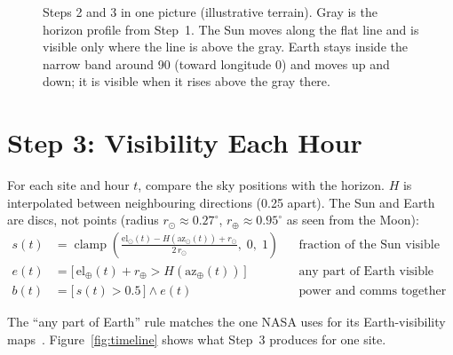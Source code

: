 \documentclass[11pt,a4paper]{article}
\newcommand{\sun}{\odot}
\newcommand{\earth}{\oplus}
\begin{document}
\begin{figure}[ht]
\caption{Steps 2 and 3 in one picture (illustrative terrain). Gray is the horizon profile from Step~1. The Sun moves along the flat line and is visible only where the line is above the gray. Earth stays inside the narrow band around 90\textdegree{} (toward longitude 0) and moves up and down; it is visible when it rises above the gray there.}
\label{fig:mask}
\end{figure}

\section{Step 3: Visibility Each Hour}

For each site and hour $t$, compare the sky positions with the horizon. $H$ is interpolated between neighbouring directions (0.25\textdegree{} apart). The Sun and Earth are discs, not points (radius $r_\sun \approx 0.27^\circ$, $r_\earth \approx 0.95^\circ$ as seen from the Moon):
\begin{align}
s(t) &= \operatorname{clamp}\!\left( \frac{\mathrm{el}_\sun(t) - H(\mathrm{az}_\sun(t)) + r_\sun}{2\,r_\sun},\; 0,\; 1 \right)
&& \text{fraction of the Sun visible (power)} \\
e(t) &= \big[\, \mathrm{el}_\earth(t) + r_\earth > H(\mathrm{az}_\earth(t)) \,\big]
&& \text{any part of Earth visible (comms)} \\
b(t) &= \big[\, s(t) > 0.5 \,\big] \wedge e(t)
&& \text{power and comms together}
\end{align}

The ``any part of Earth'' rule matches the one NASA uses for its Earth-visibility maps~\cite{pgda}. Figure~\ref{fig:timeline} shows what Step~3 produces for one site.
\end{document}
